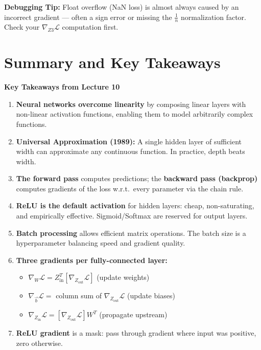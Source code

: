 \documentclass[12pt]{article}
\begin{document}
\begin{notebox}
\textbf{Debugging Tip:} Float overflow (NaN loss) is almost always caused by an incorrect
gradient --- often a sign error or missing the $\frac{1}{n}$ normalization factor. Check your
$\nabla_{Z3}\mathcal{L}$ computation first.
\end{notebox}

\section{Summary and Key Takeaways}

\begin{takeawaybox}
\textbf{Key Takeaways from Lecture 10}

\begin{enumerate}
  \item \textbf{Neural networks overcome linearity} by composing linear layers with non-linear activation functions, enabling them to model arbitrarily complex functions.

  \item \textbf{Universal Approximation (1989):} A single hidden layer of sufficient width can approximate any continuous function. In practice, depth beats width.

  \item \textbf{The forward pass} computes predictions; the \textbf{backward pass (backprop)} computes gradients of the loss w.r.t.\ every parameter via the chain rule.

  \item \textbf{ReLU is the default activation} for hidden layers: cheap, non-saturating, and empirically effective. Sigmoid/Softmax are reserved for output layers.

  \item \textbf{Batch processing} allows efficient matrix operations. The batch size is a hyperparameter balancing speed and gradient quality.

  \item \textbf{Three gradients per fully-connected layer:}
  \begin{itemize}
    \item $\nabla_W \mathcal{L} = Z_{\text{in}}^T [\nabla_{Z_{\text{out}}} \mathcal{L}]$ (update weights)
    \item $\nabla_{\vec{b}} \mathcal{L} = $ column sum of $\nabla_{Z_{\text{out}}} \mathcal{L}$ (update biases)
    \item $\nabla_{Z_{\text{in}}} \mathcal{L} = [\nabla_{Z_{\text{out}}} \mathcal{L}] W^T$ (propagate upstream)
  \end{itemize}

  \item \textbf{ReLU gradient} is a mask: pass through gradient where input was positive, zero otherwise.
\end{enumerate}
\end{takeawaybox}
\end{document}
